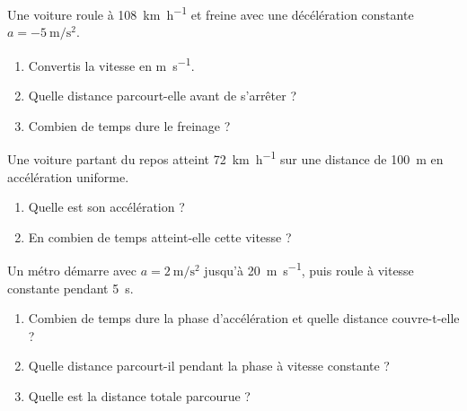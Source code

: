 \documentclass[11pt,a4paper]{article}
\begin{document}

\begin{exo}
Une voiture roule à \qty{108}{\kilo\metre\per\hour} et freine avec une décélération constante $a=\qty{-5}{\metre\per\second\squared}$.
\begin{enumerate}[label=\alph*)]
  \item Convertis la vitesse en \si{\metre\per\second}.
  \item Quelle distance parcourt-elle avant de s'arrêter ?
  \item Combien de temps dure le freinage ?
\end{enumerate}
\end{exo}

\begin{exo}
Une voiture partant du repos atteint \qty{72}{\kilo\metre\per\hour} sur une distance de \qty{100}{\metre}
en accélération uniforme.
\begin{enumerate}[label=\alph*)]
  \item Quelle est son accélération ?
  \item En combien de temps atteint-elle cette vitesse ?
\end{enumerate}
\end{exo}

\begin{exo}
Un métro démarre avec $a=\qty{2}{\metre\per\second\squared}$ jusqu'à \qty{20}{\metre\per\second}, puis roule à
vitesse constante pendant \qty{5}{\second}.
\begin{enumerate}[label=\alph*)]
  \item Combien de temps dure la phase d'accélération et quelle distance couvre-t-elle ?
  \item Quelle distance parcourt-il pendant la phase à vitesse constante ?
  \item Quelle est la distance totale parcourue ?
\end{enumerate}
\end{exo}
\end{document}
